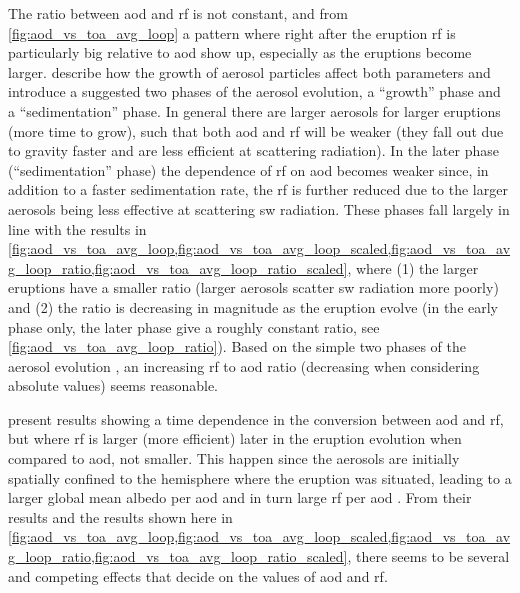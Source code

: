 \documentclass{ametsocV5}
\begin{document}
The ratio between \ac{aod} and \ac{rf} is not constant, and from
\cref{fig:aod_vs_toa_avg_loop} a pattern where right after the eruption \ac{rf} is
particularly big relative to \ac{aod} show up, especially as the eruptions become
larger. \citet[][see their sections 3.1.2, 3.2.2]{marshall2019} describe how the growth
of aerosol particles affect both parameters and introduce a suggested two phases of the
aerosol evolution, a ``growth'' phase and a ``sedimentation'' phase. In general there
are larger aerosols for larger eruptions (more time to grow), such that both \ac{aod}
and \ac{rf} will be weaker (they fall out due to gravity faster and are less efficient
at scattering radiation).
In the later phase (``sedimentation'' phase) the dependence of \ac{rf} on \ac{aod}
becomes weaker since, in addition to a faster sedimentation rate, the \ac{rf} is further
reduced due to the larger aerosols being less effective at scattering \ac{sw} radiation.
These phases fall largely in line with the results in
\cref{fig:aod_vs_toa_avg_loop,fig:aod_vs_toa_avg_loop_scaled,fig:aod_vs_toa_avg_loop_ratio,fig:aod_vs_toa_avg_loop_ratio_scaled},
where (1) the larger eruptions have a smaller ratio (larger aerosols scatter \ac{sw}
radiation more poorly) and (2) the ratio is decreasing in magnitude as the eruption
evolve (in the early phase only, the later phase give a roughly constant ratio, see
\cref{fig:aod_vs_toa_avg_loop_ratio}). Based on the simple two phases of the aerosol
evolution \citep{marshall2019}, an increasing \ac{rf} to \ac{aod} ratio (decreasing when
considering absolute values) seems reasonable.

\citet[][their figure 1c,d]{marshall2020} present results showing a time dependence in
the conversion between \ac{aod} and \ac{rf}, but where \ac{rf} is larger (more
efficient) later in the eruption evolution when compared to \ac{aod}, not smaller. This
happen since the aerosols are initially spatially confined to the hemisphere where the
eruption was situated, leading to a larger global mean albedo per \ac{aod} and in turn
large \ac{rf} per \ac{aod} \citep{marshall2020}. From their results and the results
shown here in
\cref{fig:aod_vs_toa_avg_loop,fig:aod_vs_toa_avg_loop_scaled,fig:aod_vs_toa_avg_loop_ratio,fig:aod_vs_toa_avg_loop_ratio_scaled},
there seems to be several and competing effects that decide on the values of \ac{aod}
and \ac{rf}.
\end{document}
